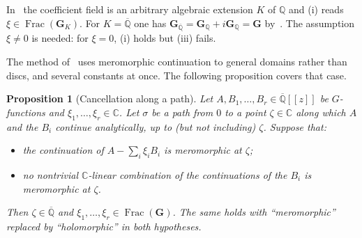 \documentclass[11pt,a4paper]{article}
\newtheorem{proposition}[theorem]{Proposition}
\theoremstyle{definition}
\theoremstyle{remark}
\newcommand{\Q}{\mathbb Q}
\newcommand{\C}{\mathbb C}
\newcommand{\Qbar}{\overline{\mathbb Q}}
\newcommand{\bG}{\mathbf G}
\DeclareMathOperator{\Frac}{Frac}
\numberwithin{equation}{section}
\begin{document}
\noindent In~\cite{p4:FR14} the coefficient field is an arbitrary algebraic extension $K$ of $\Q$ and (i) reads $\xi\in\Frac(\bG_K)$. For $K=\Qbar$ one has $\bG_{\Qbar}=\bG_\Q+i\bG_\Q=\bG$ by~\cite[Thm.~1]{p4:FR14}. The assumption $\xi\neq0$ is needed: for $\xi=0$, (i) holds but (iii) fails.

The method of~\cite{p4:CDT} uses meromorphic continuation to general domains rather than discs, and several constants at once. The following proposition covers that case.

\begin{proposition}[Cancellation along a path]\label{p4:prop:cancel}
Let $A,B_1,\dots,B_r\in\Qbar[[z]]$ be $G$-functions and $\xi_1,\dots,\xi_r\in\C$. Let $\sigma$ be a path from $0$ to a point $\zeta\in\C$ along which $A$ and the $B_i$ continue analytically, up to (but not including) $\zeta$. Suppose that:
\begin{itemize}[leftmargin=2em]
\item the continuation of $A-\sum_i\xi_iB_i$ is meromorphic at $\zeta$;
\item no nontrivial $\C$-linear combination of the continuations of the $B_i$ is meromorphic at $\zeta$.
\end{itemize}
Then $\zeta\in\Qbar$ and $\xi_1,\dots,\xi_r\in\Frac(\bG)$. The same holds with ``meromorphic'' replaced by ``holomorphic'' in both hypotheses.
\end{proposition}
\end{document}
